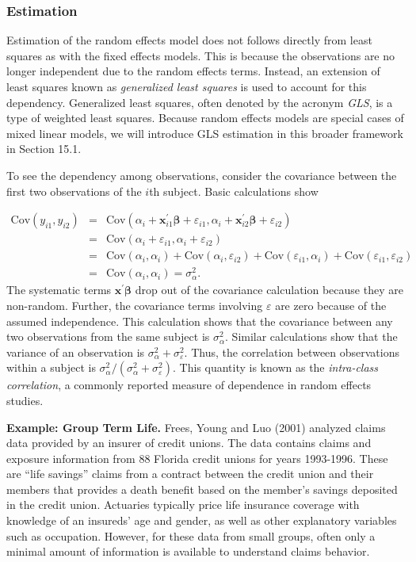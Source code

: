 \subsubsection*{Estimation}

Estimation of the random effects model does not follows directly
from least squares as with the fixed effects models. This is because
the observations are no longer independent due to the random effects
terms. Instead, an extension of least squares known as
\emph{generalized least squares} is used to account for this
dependency. Generalized least squares, often denoted by the acronym
\emph{GLS}, is a type of weighted least squares. Because random
effects models are special cases of mixed linear models, we will
introduce GLS estimation in this broader framework in Section 15.1.

To see the dependency among observations, consider the covariance
between the first two observations of the $i$th subject. Basic
calculations show

\begin{eqnarray*}
\mathrm{Cov}(y_{i1}, y_{i2}) &= &\mathrm{Cov}(\alpha_i +
\mathbf{x}_{i1}^{\prime} \boldsymbol \beta + \varepsilon_{i1},
\alpha_i + \mathbf{x}_{i2}^{\prime} \boldsymbol \beta +
\varepsilon_{i2}) \\
&= &\mathrm{Cov}(\alpha_i +\varepsilon_{i1}, \alpha_i +
 \varepsilon_{i2}) \\&= &\mathrm{Cov}(\alpha_i , \alpha_i)+\mathrm{Cov}(\alpha_i,
 \varepsilon_{i2})+\mathrm{Cov}(\varepsilon_{i1}, \alpha_i)+\mathrm{Cov}(\varepsilon_{i1},
 \varepsilon_{i2}) \\
 &= & \mathrm{Cov}(\alpha_i , \alpha_i) = \sigma^2_{\alpha} .
\end{eqnarray*}
The systematic terms $\mathbf{x}^{\prime} \boldsymbol \beta $ drop
out of the covariance calculation because they are non-random.
Further, the covariance terms involving $\varepsilon$ are zero
because of the assumed independence. This calculation shows that the
covariance between any two observations from the same subject is $
\sigma^2_{\alpha} $. Similar calculations show that the variance of
an observation is $\sigma^2_{\alpha} +\sigma^2_{\varepsilon}.$ Thus,
the correlation between observations within a subject is
$\sigma^2_{\alpha} / (\sigma^2_{\alpha} +\sigma^2_{\varepsilon})$.
This quantity is known as the \emph{intra-class correlation}, a
commonly reported measure of dependence in random effects studies.


\linejed

\textbf{Example: Group Term Life.} 
Frees, Young and Luo (2001) analyzed claims data provided by an
insurer of credit unions. The data contains claims and exposure
information from 88 Florida credit unions for years 1993-1996. These
are ``life savings'' claims from a contract between the credit union
and their members that provides a death benefit based on the
member's savings deposited in the credit union. Actuaries typically
price life insurance coverage with knowledge of an insureds' age and
gender, as well as other explanatory variables such as occupation.
However, for these data from small groups, often only a minimal
amount of information is available to understand claims behavior.

